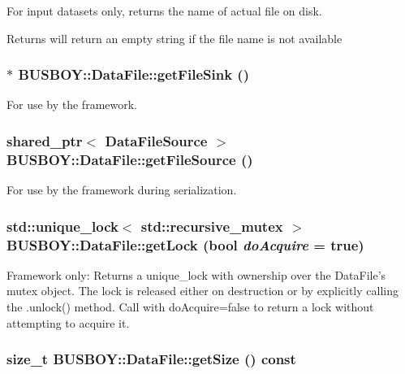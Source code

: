 For input datasets only, returns the name of actual file on disk. \begin{DoxyReturn}{Returns}
will return an empty string if the file name is not available 
\end{DoxyReturn}
\hypertarget{classBUSBOY_1_1DataFile_a11dfcd0992564133e0e35aa5badc6dcb}{
\subsubsection[{getFileSink}]{ $\ast$ BUSBOY::DataFile::getFileSink ()}}
\label{classBUSBOY_1_1DataFile_a11dfcd0992564133e0e35aa5badc6dcb}


For use by the framework. \hypertarget{classBUSBOY_1_1DataFile_a27a3668a62a4ab98e670eba28e3dc9e2}{
\subsubsection[{getFileSource}]{\setlength{\rightskip}{0pt plus 5cm}shared\_\-ptr$<$ {\bf DataFileSource} $>$ BUSBOY::DataFile::getFileSource ()}}
\label{classBUSBOY_1_1DataFile_a27a3668a62a4ab98e670eba28e3dc9e2}


For use by the framework during serialization. \hypertarget{classBUSBOY_1_1DataFile_adf051be65ca0f4d18a07dea5c9ddbbe0}{
\subsubsection[{getLock}]{\setlength{\rightskip}{0pt plus 5cm}std::unique\_\-lock$<$ std::recursive\_\-mutex $>$ BUSBOY::DataFile::getLock (bool {\em doAcquire} = {\ttfamily true})}}
\label{classBUSBOY_1_1DataFile_adf051be65ca0f4d18a07dea5c9ddbbe0}


Framework only: Returns a unique\_\-lock with ownership over the DataFile's mutex object. The lock is released either on destruction or by explicitly calling the .unlock() method. Call with doAcquire=false to return a lock without attempting to acquire it. \hypertarget{classBUSBOY_1_1DataFile_a13be7facfe1635e78e148da160b9f5a8}{
\subsubsection[{getSize}]{\setlength{\rightskip}{0pt plus 5cm}size\_\-t BUSBOY::DataFile::getSize () const}}
\label{classBUSBOY_1_1DataFile_a13be7facfe1635e78e148da160b9f5a8}


